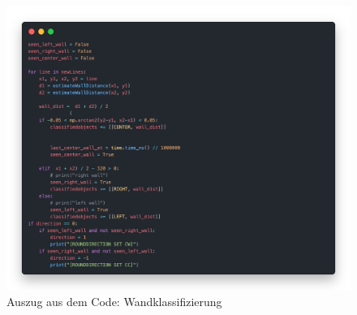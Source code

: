 \documentclass[a4paper]{scrarticle}
\begin{document}
\begin{figure}[ht]
\includegraphics[width=15cm]{classification.png}
\caption{Auszug aus dem Code: Wandklassifizierung}
\end{figure}


\clearpage
\end{document}

